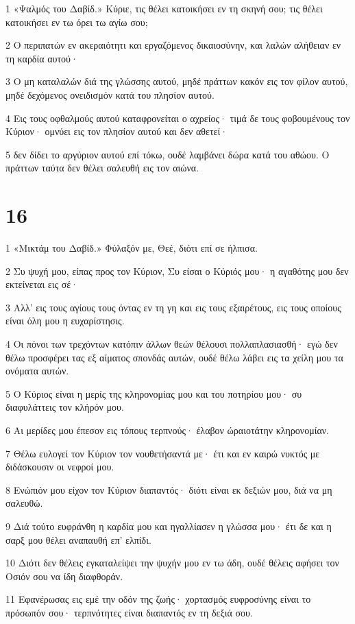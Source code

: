 \par 1 «Ψαλμός του Δαβίδ.» Κύριε, τις θέλει κατοικήσει εν τη σκηνή σου; τις θέλει κατοικήσει εν τω όρει τω αγίω σου;
\par 2 Ο περιπατών εν ακεραιότητι και εργαζόμενος δικαιοσύνην, και λαλών αλήθειαν εν τη καρδία αυτού·
\par 3 Ο μη καταλαλών διά της γλώσσης αυτού, μηδέ πράττων κακόν εις τον φίλον αυτού, μηδέ δεχόμενος ονειδισμόν κατά του πλησίον αυτού.
\par 4 Εις τους οφθαλμούς αυτού καταφρονείται ο αχρείος· τιμά δε τους φοβουμένους τον Κύριον· ομνύει εις τον πλησίον αυτού και δεν αθετεί·
\par 5 δεν δίδει το αργύριον αυτού επί τόκω, ουδέ λαμβάνει δώρα κατά του αθώου. Ο πράττων ταύτα δεν θέλει σαλευθή εις τον αιώνα.

\chapter{16}

\par 1 «Μικτάμ του Δαβίδ.» Φύλαξόν με, Θεέ, διότι επί σε ήλπισα.
\par 2 Συ ψυχή μου, είπας προς τον Κύριον, Συ είσαι ο Κύριός μου· η αγαθότης μου δεν εκτείνεται εις σέ·
\par 3 Αλλ' εις τους αγίους τους όντας εν τη γη και εις τους εξαιρέτους, εις τους οποίους είναι όλη μου η ευχαρίστησις.
\par 4 Οι πόνοι των τρεχόντων κατόπιν άλλων θεών θέλουσι πολλαπλασιασθή· εγώ δεν θέλω προσφέρει τας εξ αίματος σπονδάς αυτών, ουδέ θέλω λάβει εις τα χείλη μου τα ονόματα αυτών.
\par 5 Ο Κύριος είναι η μερίς της κληρονομίας μου και του ποτηρίου μου· συ διαφυλάττεις τον κλήρόν μου.
\par 6 Αι μερίδες μου έπεσον εις τόπους τερπνούς· έλαβον ώραιοτάτην κληρονομίαν.
\par 7 Θέλω ευλογεί τον Κύριον τον νουθετήσαντά με· έτι και εν καιρώ νυκτός με διδάσκουσιν οι νεφροί μου.
\par 8 Ενώπιόν μου είχον τον Κύριον διαπαντός· διότι είναι εκ δεξιών μου, διά να μη σαλευθώ.
\par 9 Διά τούτο ευφράνθη η καρδία μου και ηγαλλίασεν η γλώσσα μου· έτι δε και η σαρξ μου θέλει αναπαυθή επ' ελπίδι.
\par 10 Διότι δεν θέλεις εγκαταλείψει την ψυχήν μου εν τω άδη, ουδέ θέλεις αφήσει τον Οσιόν σου να ίδη διαφθοράν.
\par 11 Εφανέρωσας εις εμέ την οδόν της ζωής· χορτασμός ευφροσύνης είναι το πρόσωπόν σου· τερπνότητες είναι διαπαντός εν τη δεξιά σου.

